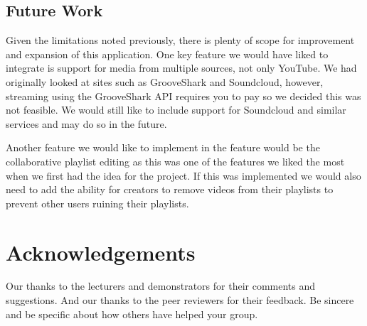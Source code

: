 \documentclass{sig-alt-release2}
\begin{document}
\subsection{Future Work}
Given the limitations noted previously, there is plenty of scope for improvement and expansion of this application. One key feature we would have liked to integrate is support for media from multiple sources, not only YouTube. We had originally looked at sites such as GrooveShark and Soundcloud, however, streaming using the GrooveShark API requires you to pay so we decided this was not feasible. We would still like to include support for Soundcloud and similar services and may do so in the future.

Another feature we would like to implement in the feature would be the collaborative playlist editing as this was one of the features we liked the most when we first had the idea for the project. If this was implemented we would also need to add the ability for creators to remove videos from their playlists to prevent other users ruining their playlists.

\section{Acknowledgements}
Our thanks to the lecturers and demonstrators for their comments and suggestions. And our thanks to the peer reviewers for their feedback.
Be sincere and be specific about how others have helped your group.



\end{document}
